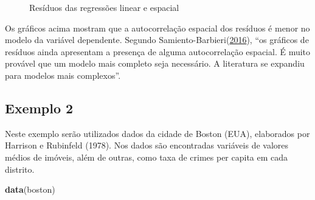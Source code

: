 \documentclass[12pt,]{article}
\newenvironment{Shaded}{\begin{snugshade}}{\end{snugshade}}
\newcommand{\KeywordTok}[1]{\textcolor[rgb]{0.13,0.29,0.53}{\textbf{{#1}}}}
\newcommand{\NormalTok}[1]{{#1}}
\begin{document}
\begin{figure}[H]

{\centering {}

}

\caption{Resíduos das regressões linear e espacial}\label{fig:residual_plot}
\end{figure}

Os gráficos acima mostram que a autocorrelação espacial dos resíduos é
menor no modelo da variável dependente. Segundo
Samiento-Barbieri(\protect\hyperlink{ref-sarmiento-barbieri}{2016}),
``os gráficos de resíduos ainda apresentam a presença de alguma
autocorrelação espacial. É muito provável que um modelo mais completo
seja necessário. A literatura se expandiu para modelos mais complexos''.

\subsection{Exemplo 2}\label{exemplo-2}

Neste exemplo serão utilizados dados da cidade de Boston (EUA),
elaborados por Harrison e Rubinfeld (1978). Nos dados são encontradas
variáveis de valores médios de imóveis, além de outras, como taxa de
crimes per capita em cada distrito.

\begin{Shaded}
\begin{Highlighting}[]
\KeywordTok{data}\NormalTok{(boston)}
\end{Highlighting}
\end{Shaded}
\end{document}
